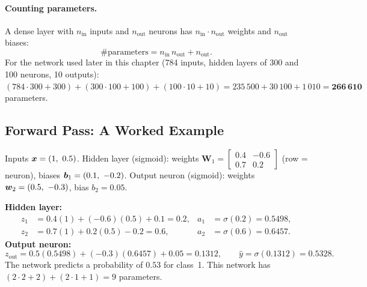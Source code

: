 \paragraph{Counting parameters.} A dense layer with $n_{\text{in}}$ inputs and $n_{\text{out}}$ neurons has $n_{\text{in}}\cdot n_{\text{out}}$ weights and $n_{\text{out}}$ biases:
\[
  \#\text{parameters}=n_{\text{in}}\,n_{\text{out}}+n_{\text{out}} .
\]
For the network used later in this chapter (784 inputs, hidden layers of 300 and 100 neurons, 10 outputs): $(784\cdot300+300)+(300\cdot100+100)+(100\cdot10+10)=235\,500+30\,100+1\,010=\mathbf{266\,610}$ parameters.

\subsection{Forward Pass: A Worked Example}

\begin{example}
Inputs $\boldsymbol{x}=(1,\ 0.5)$. Hidden layer (sigmoid): weights $\mathbf W_1=\begin{bmatrix}0.4&-0.6\\0.7&0.2\end{bmatrix}$ (row = neuron), biases $\vect b_1=(0.1,\ -0.2)$. Output neuron (sigmoid): weights $\boldsymbol{w}_2=(0.5,\ -0.3)$, bias $b_2=0.05$.

\medskip
\textbf{Hidden layer:}
\begin{align*}
z_{1}&=0.4(1)+(-0.6)(0.5)+0.1=0.2, & a_{1}&=\sigma(0.2)=0.5498,\\
z_{2}&=0.7(1)+0.2(0.5)-0.2=0.6, & a_{2}&=\sigma(0.6)=0.6457.
\end{align*}
\textbf{Output neuron:}
\[
  z_{\text{out}}=0.5(0.5498)+(-0.3)(0.6457)+0.05=0.1312,\qquad
  \hat y=\sigma(0.1312)=\mathbf{0.5328}.
\]
The network predicts a probability of $0.53$ for class~1. This network has $(2\cdot2+2)+(2\cdot1+1)=9$ parameters.
\end{example}

